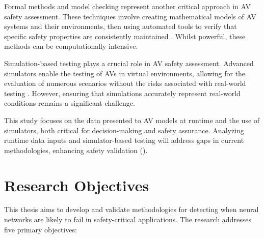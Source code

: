 Formal methods and model checking represent another critical approach in AV safety assessment. These techniques involve creating mathematical models of AV systems and their environments, then using automated tools to verify that specific safety properties are consistently maintained \cite{Luckcuck2019}. Whilst powerful, these methods can be computationally intensive.

Simulation-based testing plays a crucial role in AV safety assessment. Advanced simulators enable the testing of AVs in virtual environments, allowing for the evaluation of numerous scenarios without the risks associated with real-world testing \cite{Dosovitskiy2017}. However, ensuring that simulations accurately represent real-world conditions remains a significant challenge.

This study focuses on the data presented to AV models at runtime and the use of simulators, both critical for decision-making and safety assurance. Analyzing runtime data inputs and simulator-based testing will address gaps in current methodologies, enhancing safety validation (\cite{Dosovitskiy2017}).


\section{Research Objectives}

This thesis aims to develop and validate methodologies for detecting when neural networks are likely to fail in safety-critical applications. The research addresses five primary objectives:

